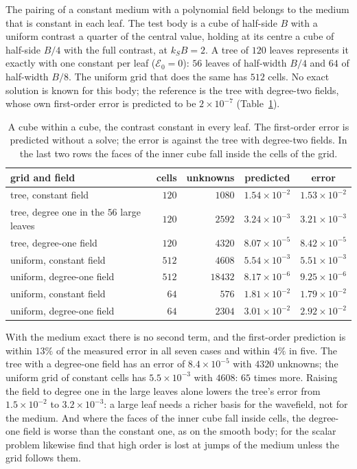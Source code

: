 \documentclass[11pt,a4paper]{article}
\newcommand{\cE}{\mathcal{E}}
\begin{document}
The pairing of a constant medium with a
polynomial field belongs to the medium that is constant in each leaf. The test body is a cube of
half-side $B$ with a uniform contrast a quarter of the central value, holding at its centre a cube of
half-side $B/4$ with the full contrast, at $k_SB=2$. A tree of $120$ leaves represents it exactly with
one constant per leaf ($\cE_0=0$): $56$ leaves of half-width $B/4$ and $64$ of half-width $B/8$. The
uniform grid that does the same has $512$ cells. No exact solution is known for this body; the
reference is the tree with degree-two fields, whose own first-order error is predicted to be
$2\times10^{-7}$ (Table~\ref{tab:blocky}).
\begin{table}[htbp]
\centering
\caption{A cube within a cube, the contrast constant in every leaf. The first-order error is predicted
without a solve; the error is against the tree with degree-two fields. In the last two rows the faces of
the inner cube fall inside the cells of the grid.}\label{tab:blocky}
\small
\begin{tabular}{@{}lrrcc@{}}
\toprule
grid and field & cells & unknowns & predicted & error \\
\midrule
tree, constant field & $120$ & $1080$ & $1.54\times10^{-2}$ & $1.53\times10^{-2}$ \\
tree, degree one in the $56$ large leaves & $120$ & $2592$ & $3.24\times10^{-3}$ & $3.21\times10^{-3}$ \\
tree, degree-one field & $120$ & $4320$ & $8.07\times10^{-5}$ & $8.42\times10^{-5}$ \\
uniform, constant field & $512$ & $4608$ & $5.54\times10^{-3}$ & $5.51\times10^{-3}$ \\
uniform, degree-one field & $512$ & $18432$ & $8.17\times10^{-6}$ & $9.25\times10^{-6}$ \\
\midrule
uniform, constant field & $64$ & $576$ & $1.81\times10^{-2}$ & $1.79\times10^{-2}$ \\
uniform, degree-one field & $64$ & $2304$ & $3.01\times10^{-2}$ & $2.92\times10^{-2}$ \\
\bottomrule
\end{tabular}
\end{table}
With the medium exact there is no second term, and the first-order prediction is within $13\%$ of the
measured error in all seven cases and within $4\%$ in five. The tree with a degree-one field has an error
of $8.4\times10^{-5}$ with $4320$ unknowns; the uniform grid of constant cells has $5.5\times10^{-3}$
with $4608$: $65$ times more. Raising the field to degree one in the large leaves alone lowers the tree's
error from $1.5\times10^{-2}$ to $3.2\times10^{-3}$: a large leaf needs a richer basis for the
wavefield, not for the medium. And where the faces of the inner cube fall inside cells, the degree-one
field is worse than the constant one, as on the smooth body; for the scalar problem
\citet{Anderson2026} likewise find that high order is lost at jumps of the medium unless the grid
follows them.
\end{document}
